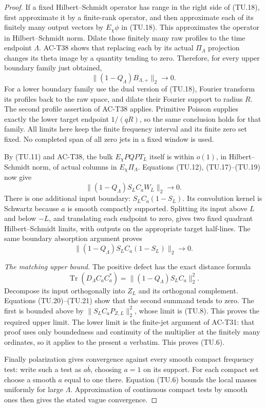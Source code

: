 \begin{proof}
If a fixed Hilbert--Schmidt operator has range in the
right side of (TU.18), first approximate it by a finite-rank
operator, and then approximate each of its finitely many
output vectors by \(E_\chi\phi\) in (TU.18).
This approximates the operator in Hilbert--Schmidt norm.
Dilate those finitely many raw profiles to the time
endpoint \(\Lambda\).
AC-T38 shows that replacing each by its actual
\(\Pi_\Lambda\) projection changes its theta image by
a quantity tending to zero.
Therefore, for every upper boundary family just obtained,
\[
                 \|(1-Q_\Lambda)B_{\Lambda,+}\|_2\to0.
 \tag{TU.19}
\]
For a lower boundary family use the dual version of
(TU.18), Fourier transform its profiles back to the raw
space, and dilate their Fourier support to radius \(R\).
The second profile assertion of AC-T38 applies.
Primitive Poisson supplies exactly the lower target endpoint
\(1/(qR)\), so the same conclusion holds for that family.
All limits here keep the finite frequency interval and its
finite zero set fixed.  No completed span of all zero jets
in a fixed window is used.

By (TU.11) and AC-T38, the bulk \(E_\chi PQPT_L\) itself
is within \(o(1)\), in Hilbert--Schmidt norm, of actual
columns in \(E_\chi\Pi_\Lambda\).
Equations (TU.12), (TU.17)--(TU.19) now give
\[
                    \|(1-Q_\Lambda)S_LC_aW_L\|_2\to0.
 \tag{TU.20}
\]
There is one additional input boundary:
\(S_LC_a(1-S_L)\).
Its convolution kernel is Schwartz because \(a\) is
smooth compactly supported.
Splitting its input above \(L\) and below \(-L\),
and translating each endpoint to zero, gives two fixed
quadrant Hilbert--Schmidt limits, with outputs on the
appropriate target half-lines.
The same boundary absorption argument proves
\[
                  \|(1-Q_\Lambda)S_LC_a(1-S_L)\|_2\to0.
 \tag{TU.21}
\]

\emph{The matching upper bound.}
The positive defect has the exact distance formula
\[
       \operatorname{Tr}(D_\Lambda C_aC_a^*)
                    =\|(1-Q_\Lambda)S_LC_a\|_2^2 .
 \tag{TU.22}
\]
Decompose its input orthogonally into \(Z_L\) and its
orthogonal complement.
Equations (TU.20)--(TU.21) show that the second summand
tends to zero.  The first is bounded above by
\(\|S_LC_aP_{Z,L}\|_2^2\), whose limit is (TU.8).
This proves the required upper limit.
The lower limit is the finite-jet argument of AC-T31:
that proof uses only boundedness and continuity of the
multiplier at the finitely many ordinates, so it applies
to the present \(a\) verbatim.
This proves (TU.6).

Finally polarization gives convergence against every
smooth compact frequency test: write such a test as
\(a\overline b\), choosing \(a=1\) on its support.
For each compact set choose a smooth \(a\) equal to one
there.  Equation (TU.6) bounds the local masses uniformly
for large \(\Lambda\).
Approximation of continuous compact tests by smooth ones
then gives the stated vague convergence.
\end{proof}

